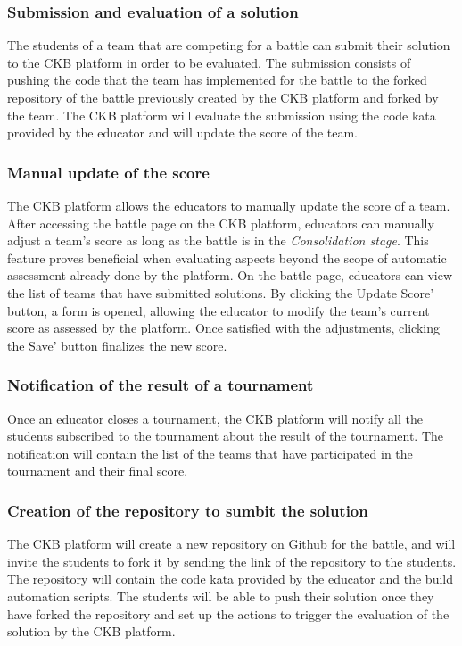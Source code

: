 \subsubsection{Submission and evaluation of a solution}
The students of a team that are competing for a battle can submit their solution to the CKB platform in order to be evaluated. The submission consists of pushing the code that the team has implemented for the battle to the forked repository of the battle previously created by the CKB platform and forked by the team.
The CKB platform will evaluate the submission using the code kata provided by the educator and will update the score of the team.
\subsubsection{Manual update of the score}
The CKB platform allows the educators to manually update the score of a team. After accessing the battle page on the CKB platform, educators can manually adjust a team's score as long as the battle is in the \textit{Consolidation stage}. This feature proves beneficial when evaluating aspects beyond the scope of automatic assessment already done by the platform. On the battle page, educators can view the list of teams that have submitted solutions. By clicking the Update Score' button, a form is opened, allowing the educator to modify the team's current score as assessed by the platform. Once satisfied with the adjustments, clicking the Save' button finalizes the new score.
\subsubsection{Notification of the result of a tournament}
Once an educator closes a tournament, the CKB platform will notify all the students subscribed to the tournament about the result of the tournament. The notification will contain the list of the teams that have participated in the tournament and their final score.
\subsubsection{Creation of the repository to sumbit the solution}
The CKB platform will create a new repository on Github for the battle, and will invite the students to fork it by sending the link of the repository to the students. The repository will contain the code kata provided by the educator and the build automation scripts. The students will be able to push their solution once they have forked the repository and set up the actions to trigger the evaluation of the solution by the CKB platform.

